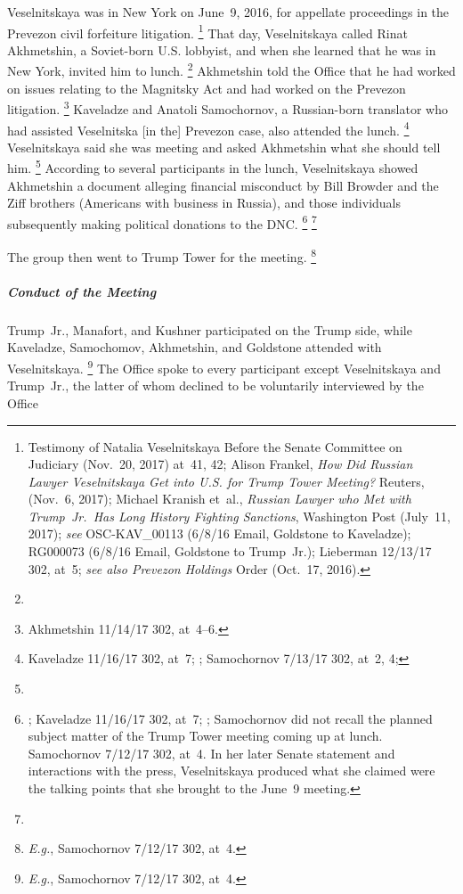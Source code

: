 Veselnitskaya was in New York on June~9, 2016, for appellate proceedings in the Prevezon civil forfeiture litigation.%
\footnote{Testimony of Natalia Veselnitskaya Before the Senate Committee on Judiciary (Nov.~20, 2017) at~41, 42;
Alison Frankel, \textit{How Did Russian Lawyer Veselnitskaya Get into U.S. for Trump Tower Meeting?} Reuters, (Nov.~6, 2017);
Michael Kranish et~al., \textit{Russian Lawyer who Met with Trump~Jr.\ Has Long History Fighting Sanctions}, Washington Post (July~11, 2017);
\textit{see} OSC-KAV\_00113 (6/8/16 Email, Goldstone to Kaveladze);
RG000073 (6/8/16 Email, Goldstone to Trump~Jr.);
Lieberman 12/13/17 302, at~5;
\textit{see also Prevezon Holdings} Order (Oct.~17, 2016).}
That day, Veselnitskaya called Rinat Akhmetshin, a Soviet-born U.S. lobbyist,
and when she learned that he was in New York, invited him to lunch.%
\footnote{}
Akhmetshin told the Office that he had worked on issues relating to the Magnitsky Act and had worked on the Prevezon litigation.%
\footnote{Akhmetshin 11/14/17 302, at~4--6. }
Kaveladze and Anatoli Samochornov, a Russian-born translator who had assisted Veselnitska [in the] Prevezon case, also attended the lunch.%
\footnote{Kaveladze 11/16/17 302, at~7;
;
Samochornov 7/13/17 302, at~2, 4;
}
 Veselnitskaya said she was meeting  and asked Akhmetshin what she should tell him.%
\footnote{}
According to several participants in the lunch, Veselnitskaya showed Akhmetshin a document alleging financial misconduct by Bill Browder and the Ziff brothers (Americans with business in Russia), and those individuals subsequently making political donations to the DNC\null.%
\footnote{;
Kaveladze 11/16/17 302, at~7;
;
Samochornov did not recall the planned subject matter of the Trump Tower meeting coming up at lunch.
 Samochornov 7/12/17 302, at~4.
In her later Senate statement and interactions with the press, Veselnitskaya produced what she claimed were the talking points that she brought to the June~9 meeting.}
\footnote{}

The group then went to Trump Tower for the meeting.%
\footnote{\textit{E.g.}, Samochornov 7/12/17 302, at~4.}

\subparagraph{Conduct of the Meeting}

Trump~Jr., Manafort, and Kushner participated on the Trump side, while Kaveladze, Samochomov, Akhmetshin, and Goldstone attended with Veselnitskaya.%
\footnote{\textit{E.g.}, Samochornov 7/12/17 302, at~4.}
The Office spoke to every participant except Veselnitskaya and Trump~Jr., the latter of whom declined to be voluntarily interviewed by the Office

